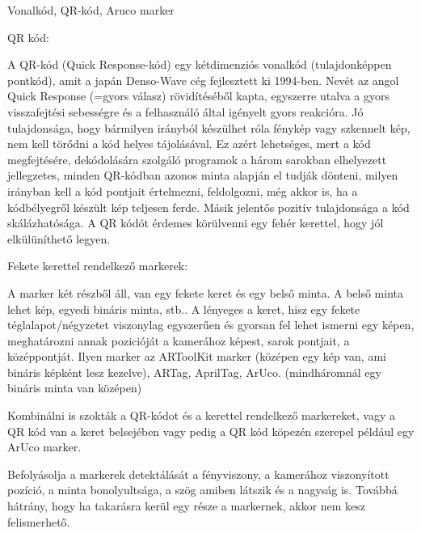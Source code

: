 


Vonalkód, QR-kód, Aruco marker

QR kód:

A QR-kód (Quick Response-kód) egy kétdimenziós vonalkód (tulajdonképpen pontkód), amit a japán Denso-Wave cég fejlesztett ki 1994-ben. Nevét az angol Quick Response (=gyors válasz) rövidítéséből kapta, egyszerre utalva a gyors visszafejtési sebességre és a felhasználó által igényelt gyors reakcióra. 
Jó tulajdonsága, hogy bármilyen irányból készülhet róla fénykép vagy szkennelt kép, nem kell törődni a kód helyes tájolásával. Ez azért lehetséges, mert a kód megfejtésére, dekódolására szolgáló programok a három sarokban elhelyezett jellegzetes, minden QR-kódban azonos minta alapján el tudják dönteni, milyen irányban kell a kód pontjait értelmezni, feldolgozni, még akkor is, ha a kódbélyegről készült kép teljesen ferde. 
Másik jelentős pozitív tulajdonsága a kód skálázhatósága.
A QR kódót érdemes körülvenni egy fehér kerettel, hogy jól elkülüníthető legyen.


Fekete kerettel rendelkező markerek:

A marker két részből áll, van egy fekete keret és egy belső minta. A belső minta lehet kép, egyedi bináris minta, stb..
A lényeges a keret, hisz egy fekete téglalapot/négyzetet viszonylag egyszerűen és gyorsan fel lehet ismerni egy képen, meghatározni annak pozicióját a kamerához képest, sarok pontjait, a középpontját.
Ilyen marker az ARToolKit marker (középen egy kép van, ami bináris képként lesz kezelve), ARTag, AprilTag, ArUco. (mindháromnál egy bináris minta van középen)

Kombinálni is szokták a QR-kódot és a kerettel rendelkező markereket, vagy a QR kód van a keret belsejében vagy pedig a QR kód köpezén szerepel például egy ArUco marker.

Befolyásolja a markerek detektálását a fényviszony, a kamerához viszonyított pozíció, a minta bonolyultsága, a szög amiben látszik és a nagyság is. Továbbá hátrány, hogy ha takarásra kerül egy része a markernek, akkor nem kesz felismerhető.



